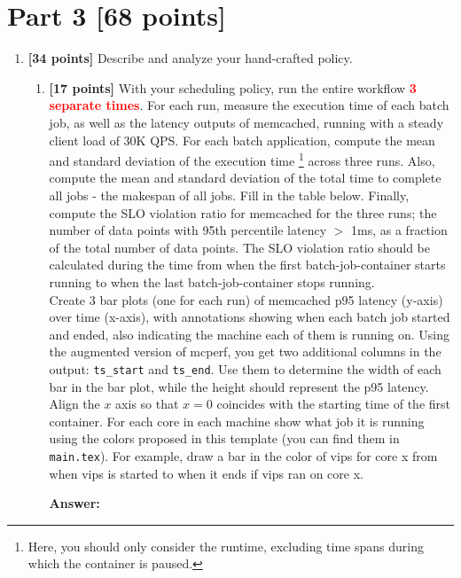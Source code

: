 \section*{Part 3 [68 points]}

\begin{enumerate}
    \item \textbf{[34 points]} Describe and analyze your hand-crafted policy. 
    \begin{enumerate}
    \item \textbf{[17 points]} With your scheduling policy, run the entire workflow \textbf{\textcolor{red}{3 separate times}}. For each run, measure the execution time of each batch job, as well as the latency outputs of memcached, running with a steady client load of 30K QPS. For each batch application, compute the mean and standard deviation of the execution time \footnote{Here, you should only consider the runtime, excluding time spans during which the container is paused.} across three runs. Also, compute the mean and standard deviation of the total time to complete all jobs - the makespan of all jobs. Fill in the table below. Finally, compute the SLO violation ratio for memcached for the three runs; the number of data points with 95th percentile latency $>$ 1ms, as a fraction of the total number of data points. The SLO violation ratio should be calculated during the time from when the first batch-job-container starts running to when the last batch-job-container stops running.  \\

        Create 3 bar plots (one for each run) of memcached p95 latency (y-axis) over time (x-axis), with annotations showing when each batch job started and ended, also indicating the machine each of them is running on. Using the augmented version of mcperf, you get two additional columns in the output: \texttt{ts\_start} and \texttt{ts\_end}. Use them to determine the width of each bar in the bar plot, while the height should represent the p95 latency. Align the $x$ axis so that $x=0$ coincides with the starting time of the first container. 
    For each core in each machine show what job it is running using the colors proposed in this template (you can find them in \texttt{main.tex}). For example, draw a bar in {\color{vips}the color of vips} for core x from when vips is started to when it ends if vips ran on core x.

    
    \textbf{Answer:} %


\end{enumerate}
\end{enumerate}
